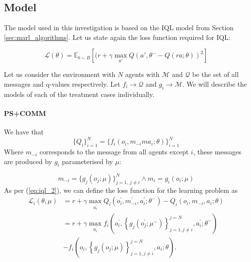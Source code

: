 \documentclass{article}
\begin{document}

\subsection{Model}

The model used in this investigation is based on the IQL model from Section \ref{sec:marl_algorithms}. Let us state again the loss function required for IQL:

\begin{equation}\label{eq:iql_2}
	\mathcal{L}(\theta) = \mathbb{E}_{b \sim B}\left[ (r + \gamma \max_{a'} Q(a', \theta^- - Q(ra; \theta) )^2 \right]
\end{equation}


Let us consider the environment with $N$ agents with $\mathcal{M}$ and $\mathcal{Q}$ be the set of all messages and q-values respectively. Let $f_i \to \mathcal{Q}$ and $g_i \to \mathcal{M}$. We will describe the models of each of the treatment cases individually.

\paragraph{PS+COMM} We have that 
\begin{equation}
	\{Q_i\}_{i=1}^N =\{f_i(o_i, m_{-i}m a_i; \theta)\}_{i = 1}^N
\end{equation}
Where $m_{-i}$ corresponds to the message from all agents except $i$, these messages are produced by $g_i$ parameterised by $\mu$:

\begin{equation}
	m_{-i} = \{ g_j(o_j; \mu) \}^N_{j = 1, \ j \neq i} \wedge m_i = g_i(o_i; \mu) 
\end{equation}
As per (\ref{eq:iql_2}), we can define the loss function for the learning problem as
\begin{equation}
\begin{aligned}
\mathcal{L}_i(\theta, \mu) & =r+\gamma \max _{a_i^{\prime}} Q_i\left(o_i^{\prime}, m_{-i}^{\prime}, a_i^{\prime} ; \theta^{-}\right)-Q_i\left(o_i, m_{-i}, a_i ; \theta\right) \\
& =r+\gamma \max _{a_i^{\prime}} f_i\left(o_i^{\prime},\left\{g_j\left(o_j^{\prime} ; \mu^{-}\right)\right\}_{j=1, j \neq i}^{j=N}, a_i^{\prime} ; \theta^{-}\right) \\
& -f_i\left(o_i,\left\{g_j\left(o_j ; \mu\right)\right\}_{j=1, j \neq i}^{j=N}, a_i ; \theta\right) .
\end{aligned}
\end{equation}
\end{document}
